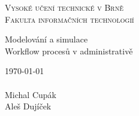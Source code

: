 

\begin{titlepage}

\begin{center}
  
		{\Huge  {\scshape Vysoké učení technické v Brně}\\}
		{\huge {\scshape Fakulta informačních technologií}\\}
	
		
	{\LARGE Modelování a simulace}
	\\
	\medskip
	{\Huge Workflow procesů v administrativě}\\
\end{center}
{\Large \today \\\\ Michal Cupák \\ Aleš Dujíček}


\end{titlepage}
